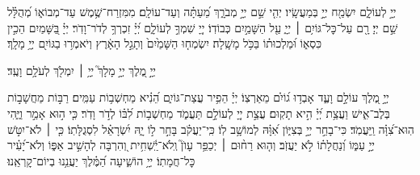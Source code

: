 \documentclass[twoside, openany, parskip=half, 11pt]{book}
\begin{document}
\newcommand{\melekhmalakhyimlokh}{
\source{תהלים י}יְיָ֣ מֶ֭לֶךְ
\source{תהלים צג}יְיָ֣ מָלָךְ֮
\source{שמות טו} יְיָ֥ ׀ יִמְלֹ֖ךְ לְעֹלָ֥ם וָעֶֽד׃
}

\label{yehikvod}
יְיָ֣ לְעוֹלָ֑ם יִשְׂמַ֖ח יְיָ֣ בְּמַעֲשָֽׂיו׃
יְהִ֤י שֵׁ֣ם יְיָ֣ מְבֹרָ֑ךְ מֵ֝עַתָּ֗ה וְעַד־עוֹלָֽם׃
מִמִּזְרַח־שֶׁ֥מֶשׁ עַד־מְבוֹא֑וֹ מְ֝הֻלָּ֗ל שֵׁ֣ם יְיָ׃
רָ֖ם עַל־כׇּל־גּוֹיִ֥ם ׀ יְיָ֑ עַ֖ל הַשָּׁמַ֣יִם כְּבוֹדֽוֹ׃
 יְיָ֭ שִׁמְךָ֣ לְעוֹלָ֑ם יְ֝יָ֗ זִכְרְךָ֥ לְדֹר־וָדֹֽר׃
 יְיָ֗ בַּ֭שָּׁמַיִם הֵכִ֣ין כִּסְא֑וֹ וּ֝מַלְכוּת֗וֹ בַּכֹּ֥ל מָשָֽׁלָה׃
 יִשְׂמְח֤וּ הַשָּׁמַ֙יִם֙ וְתָגֵ֣ל הָאָ֔רֶץ וְיֹאמְר֥וּ בַגּוֹיִ֖ם יְיָ֥ מָלָֽךְ׃
\melekhmalakhyimlokh
{} יְיָ֣ מֶ֭לֶךְ עוֹלָ֣ם וָעֶ֑ד אָבְד֥וּ ג֝וֹיִ֗ם מֵאַרְצֽוֹ׃
 יְיָ֗ הֵפִ֥יר עֲצַת־גּוֹיִ֑ם הֵ֝נִ֗יא מַחְשְׁב֥וֹת עַמִּֽים׃
רַבּ֣וֹת מַחֲשָׁב֣וֹת בְּלֶב־אִ֑ישׁ וַעֲצַ֥ת יְ֝יָ֗ הִ֣יא תָקֽוּם׃
עֲצַ֣ת יְיָ֭ לְעוֹלָ֣ם תַּעֲמֹ֑ד מַחְשְׁב֥וֹת לִ֝בּ֗וֹ לְדֹ֣ר וָדֹֽר׃
כִּ֤י ה֣וּא אָמַ֣ר וַיֶּ֑הִי הֽוּא־צִ֝וָּ֗ה וַֽיַּעֲמֹֽד׃
כִּי־בָחַ֣ר יְיָ֣ בְּצִיּ֑וֹן אִ֝וָּ֗הּ לְמוֹשָׁ֥ב לֽוֹ׃
כִּֽי־יַעֲקֹ֗ב בָּחַ֣ר ל֣וֹ יָ֑הּ יִ֝שְׂרָאֵ֗ל לִסְגֻלָּתֽוֹ׃
כִּ֤י ׀ לֹא־יִטֹּ֣שׁ יְיָ֣ עַמּ֑וֹ וְ֝נַחֲלָת֗וֹ לֹ֣א יַעֲזֹֽב׃
וְה֤וּא רַח֨וּם ׀ יְכַפֵּ֥ר עָוֺן֮ וְֽלֹא־יַֽ֫שְׁחִ֥ית וְ֭הִרְבָּה לְהָשִׁ֣יב אַפּ֑וֹ
וְלֹא־יָ֝עִ֗יר כׇּל־חֲמָתֽוֹ׃
 יְיָ֥ הוֹשִׁ֑יעָה הַ֝מֶּ֗לֶךְ יַעֲנֵ֥נוּ בְיוֹם־קׇרְאֵֽנוּ׃
\end{document}
